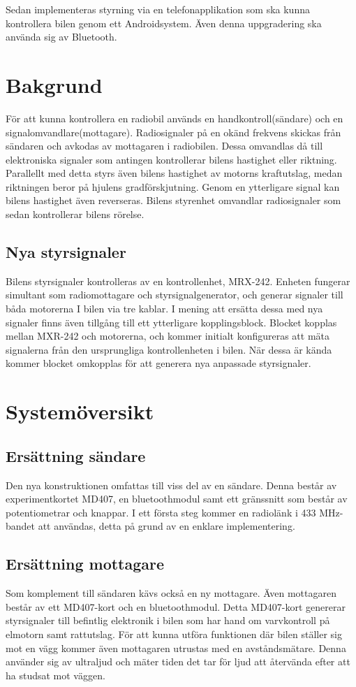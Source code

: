 \documentclass[a4paper]{article}
\begin{document}
Sedan implementeras styrning via en telefonapplikation som ska kunna kontrollera bilen genom ett Androidsystem. Även denna uppgradering ska använda sig av Bluetooth.


\section{Bakgrund}
För att kunna kontrollera en radiobil används en handkontroll(sändare) och en signalomvandlare(mottagare). Radiosignaler på en okänd frekvens skickas från sändaren och avkodas av mottagaren i radiobilen. Dessa omvandlas då till elektroniska signaler som antingen kontrollerar bilens hastighet eller riktning. Parallellt med detta styrs även bilens hastighet av motorns kraftutslag, medan riktningen beror på hjulens gradförskjutning. Genom en ytterligare signal kan bilens hastighet även reverseras. Bilens styrenhet omvandlar radiosignaler som sedan kontrollerar bilens rörelse.

\subsection{Nya styrsignaler}
Bilens styrsignaler kontrolleras av en kontrollenhet, MRX-242. Enheten fungerar simultant som radiomottagare och styrsignalgenerator, och generar signaler till båda motorerna I bilen via tre kablar. I mening att ersätta dessa med nya signaler finns även tillgång till ett ytterligare kopplingsblock. Blocket kopplas mellan MXR-242 och motorerna, och kommer initialt konfigureras att mäta signalerna från den ursprungliga kontrollenheten i bilen. När dessa är kända kommer blocket omkopplas för att generera nya anpassade styrsignaler. 

\section{Systemöversikt}
\subsection{Ersättning sändare}
Den nya konstruktionen omfattas till viss del av en sändare. Denna består av experimentkortet MD407, en bluetoothmodul samt ett gränssnitt som består av potentiometrar och knappar. I ett första steg kommer en radiolänk i 433 MHz-bandet att användas, detta på grund av en enklare implementering.

\subsection{Ersättning mottagare}
Som komplement till sändaren kävs också en ny mottagare. Även mottagaren består av ett MD407-kort och en bluetoothmodul. Detta MD407-kort genererar styrsignaler till befintlig elektronik i bilen som har hand om varvkontroll på elmotorn samt rattutslag.
För att kunna utföra funktionen där bilen ställer sig mot en vägg kommer även mottagaren utrustas med en avståndsmätare. Denna använder sig av ultraljud och mäter tiden det tar för ljud att återvända efter att ha studsat mot väggen.
\end{document}
